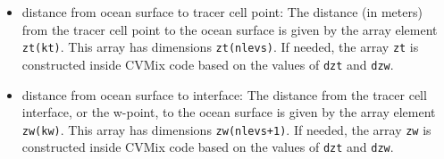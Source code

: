 \begin{itemize}
\item {\sc distance from ocean surface to tracer cell point}: The
  distance (in meters) from the tracer cell point to the ocean surface
  is given by the array element {\tt zt(kt)}.  This array has
  dimensions {\tt zt(nlevs)}.  If needed, the array {\tt zt} is
  constructed inside CVMix code based on the values of {\tt dzt} and
  {\tt dzw}. 

\item {\sc distance from ocean surface to interface}: The distance
  from the tracer cell interface, or the w-point, to the ocean surface
  is given by the array element {\tt zw(kw)}.  This array has
  dimensions {\tt zw(nlevs+1)}.  If needed, the array {\tt zw} is
  constructed inside CVMix code based on the values of {\tt dzt} and
  {\tt dzw}.

\end{itemize}



